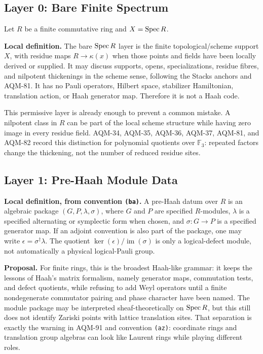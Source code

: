 \subsection{Layer 0: Bare Finite Spectrum}

Let \(R\) be a finite commutative ring and \(X=\operatorname{Spec} R\).

\textbf{Local definition.}  The bare \(\operatorname{Spec} R\) layer is the finite
topological/scheme support \(X\), with residue maps \(R\to\kappa(x)\) when
those points and fields have been locally derived or supplied.  It may
discuss supports, opens, specializations, residue fibres, and nilpotent
thickenings in the scheme sense, following the Stacks anchors and AQM-81.  It
has no Pauli operators, Hilbert space, stabilizer Hamiltonian, translation
action, or Haah generator map.  Therefore it is not a Haah code.

This permissive layer is already enough to prevent a common mistake.  A
nilpotent class in \(R\) can be part of the local scheme structure while
having zero image in every residue field.  AQM-34, AQM-35, AQM-36, AQM-37,
AQM-81, and AQM-82 record this distinction for polynomial quotients over
\(\mathbb F_3\): repeated factors change the thickening, not the number of
reduced residue sites.

\subsection{Layer 1: Pre-Haah Module Data}

\textbf{Local definition, from convention \texttt{(ba)}.}  A pre-Haah datum
over \(R\) is an algebraic package \((G,P,\lambda,\sigma)\), where \(G\) and
\(P\) are specified \(R\)-modules, \(\lambda\) is a specified alternating or
symplectic form when chosen, and \(\sigma:G\to P\) is a specified generator
map.  If an adjoint convention is also part of the package, one may write
\(\epsilon=\sigma^\dagger\lambda\).  The quotient
\(\ker(\epsilon)/\operatorname{im}(\sigma)\) is only a logical-defect module,
not automatically a physical logical-Pauli group.

\textbf{Proposal.}  For finite rings, this is the broadest Haah-like grammar:
it keeps the lessons of Haah's matrix formalism, namely generator maps,
commutation tests, and defect quotients, while refusing to add Weyl operators
until a finite nondegenerate commutator pairing and phase character have been
named.  The module package may be interpreted sheaf-theoretically on
\(\operatorname{Spec} R\), but this still does not identify Zariski points with lattice
translation sites.  That separation is exactly the warning in AQM-91 and
convention \texttt{(az)}: coordinate rings and translation group algebras can
look like Laurent rings while playing different roles.

